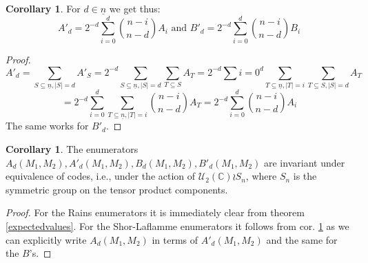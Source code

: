 \documentclass{article}
\def\C{\mathbb{C}}
\def\U{\mathcal{U}}
\def\n{\underline{n}}
\newenvironment{bew}{\begin{proof}[Proof]}{\end{proof}}
\theoremstyle{definition}
\newtheorem{cor}[Satz]{Corollary}
\begin{document}
\begin{cor}\label{corlincomb}
For $d \in \n$ we get thus: \begin{equation} A'_d = 2^{-d} \sum_{i=0}^d \binom{n-i}{n-d} A_i \text{  and   } B'_d = 2^{-d} \sum_{i=0}^d \binom{n-i}{n-d} B_i \end{equation}
\begin{bew}
\begin{equation}  A'_d = \sum_{S \subseteq \n, |S| = d} A'_S = 2^{-d} \sum_{S \subseteq \n, |S| = d} \sum_{T \subseteq S} A_T  = 2^{-d} \sum{i=0}^d \sum_{T \subseteq \n, |T| = i} \sum_{T \subseteq S, |S| = d} A_T \end{equation}
 \begin{equation} = 2^{-d} \sum_{i=0}^d \sum_{T \subseteq \n, |T| = i} \binom{n-i}{n-d}A_T = 2^{-d} \sum_{i=0}^d \binom{n-i}{n-d} A_i \end{equation}
The same works for $B'_d$.
\end{bew}
\end{cor}

\begin{cor}
The enumerators $A_d(M_1,M_2), A'_d(M_1,M_2), B_d(M_1,M_2), B'_d(M_1,M_2)$ are invariant under equivalence of codes, i.e., under the action of $ \U_2(\C) \wr S_n$, where $S_n$ is the symmetric group on the tensor product components.
\begin{bew}
For the Rains enumerators it is immediately clear from theorem \ref{expectedvalues}. For the Shor-Laflamme enumerators it follows from cor. \ref{corlincomb}  as we can explicitly write $A_d(M_1,M_2)$ in terms of $A'_d(M_1,M_2)$ and the same for the $B$'s.
\end{bew}
\end{cor}
\end{document}
